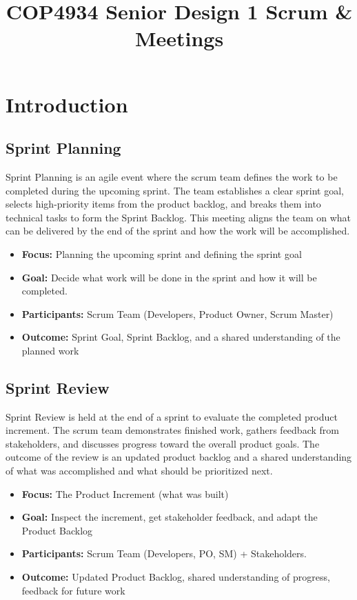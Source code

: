 \documentclass{article}
\title{COP4934 Senior Design 1 Scrum \& Meetings }
\date{}
\begin{document}
\maketitle
\tableofcontents
\newpage

\section{Introduction}
\subsection{Sprint Planning}
Sprint Planning is an agile event where the scrum team defines the work to be completed during the upcoming sprint. The team establishes a clear sprint goal, selects high-priority items from the product backlog, and breaks them into technical tasks to form the Sprint Backlog. This meeting aligns the team on what can be delivered by the end of the sprint and how the work will be accomplished.
\begin{itemize}
    \item \textbf{Focus:} Planning the upcoming sprint and defining the sprint goal
    \item \textbf{Goal:} Decide what work will be done in the sprint and how it will be completed.
    \item \textbf{Participants:} Scrum Team (Developers, Product Owner, Scrum Master)
    \item \textbf{Outcome:} Sprint Goal, Sprint Backlog, and a shared understanding of the planned work
\end{itemize}
\subsection{Sprint Review}
Sprint Review is held at the end of a sprint to evaluate the completed product increment. The scrum team demonstrates finished work, gathers feedback from stakeholders, and discusses progress toward the overall product goals. The outcome of the review is an updated product backlog and a shared understanding of what was accomplished and what should be prioritized next.
\begin{itemize}
    \item \textbf{Focus:} The Product Increment (what was built)
    \item \textbf{Goal:} Inspect the increment, get stakeholder feedback, and adapt the Product Backlog
    \item \textbf{Participants:} Scrum Team (Developers, PO, SM) + Stakeholders.
    \item \textbf{Outcome:} Updated Product Backlog, shared understanding of progress, feedback for future work
\end{itemize}
\end{document}
